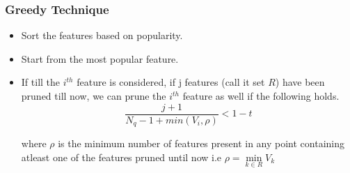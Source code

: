 \documentclass{beamer}
\begin{document}
%
%
%

\begin{frame}
\frametitle{Greedy Technique}

\begin{itemize}
	\item<1-> Sort the features based on popularity.
	\item<2-> Start from the most popular feature.	
	\item<3-> If till the $i^{th}$ feature is considered, if j features (call it set $R$) have been pruned till now, we can prune the $i^{th}$ feature as well if the following holds.
	\begin{equation}
	\label{eq: greedy}
	\frac{j+1}{N_q - 1 + min(V_{i}, \rho)} < 1-t 
	\end{equation}
	
where 	$\rho$ is the minimum  number of features present in any point containing atleast one of the features pruned until now i.e $\rho = \min\limits_{k\in R} V_k$ 

\end{itemize}
\end{frame}
\end{document}
